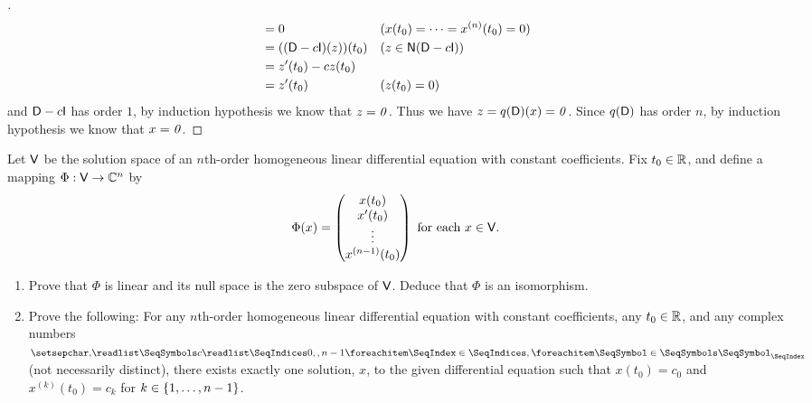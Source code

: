 \begin{proof}[]
\begin{align*}
           & = 0                        &  & (x(t_0) = \cdots = x^{(n)}(t_0) = 0) \\
           & = ((\Dop - c \IT)(z))(t_0) &  & (z \in \ns{\Dop - c \IT})            \\
           & = z'(t_0) - c z(t_0)                                                 \\
           & = z'(t_0)                  &  & (z(t_0) = 0)
  \end{align*}
  and \(\Dop - c \IT\) has order \(1\), by induction hypothesis we know that \(z = \mathit{0}\).
  Thus we have \(z = q(\mathsf{D})(x) = \mathit{0}\).
  Since \(q(\mathsf{D})\) has order \(n\), by induction hypothesis we know that \(x = \mathit{0}\).
\end{proof}

\begin{ex}\label{ex:2.7.15}
  Let \(\mathsf{V}\) be the solution space of an \(n\)th-order homogeneous linear differential equation with constant coefficients.
  Fix \(t_0 \in \mathbb{R}\), and define a mapping \(\Phi : \mathsf{V} \to \mathbb{C}^n\) by
  \[
    \Phi(x) = \begin{pmatrix}
      x(t_0)  \\
      x'(t_0) \\
      \vdots  \\
      x^{(n - 1)}(t_0)
    \end{pmatrix} \text{ for each } x \in \mathsf{V}.
  \]
  \begin{enumerate}
    \item Prove that \(\Phi\) is linear and its null space is the zero subspace of \(\mathsf{V}\).
          Deduce that \(\Phi\) is an isomorphism.
    \item Prove the following:
          For any \(n\)th-order homogeneous linear differential equation with constant coefficients, any \(t_0 \in \mathbb{R}\), and any complex numbers \(\seq{c}{0,,n-1}\) (not necessarily distinct), there exists exactly one solution, \(x\), to the given differential equation such that \(x(t_0) = c_0\) and \(x^{(k)}(t_0) = c_k\) for \(k \in \left\lbrace1, \dots, n - 1\right\rbrace\).
  \end{enumerate}
\end{ex}

